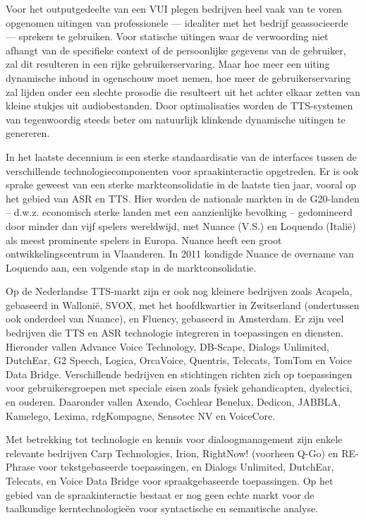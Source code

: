 \begin{multicols}{2}
    Voor het outputgedeelte van een VUI plegen bedrijven heel vaak van te voren opgenomen uitingen van professionele --- idealiter met het bedrijf geassocieerde --- sprekers te gebruiken. Voor statische uitingen waar de verwoording niet afhangt van de specifieke context of de persoonlijke gegevens van de gebruiker, zal dit resulteren in een rijke gebruikerservaring. Maar hoe meer een uiting dynamische inhoud in ogenschouw moet nemen, hoe meer de gebruikerservaring zal lijden onder een slechte prosodie die resulteert uit het achter elkaar zetten van kleine stukjes uit audiobestanden. Door optimalisaties worden de TTS-systemen van tegenwoordig steeds beter om natuurlijk klinkende dynamische uitingen  te genereren.

    In het laatste decennium is een sterke standaardisatie van de interfaces tussen de verschillende technologiecomponenten voor spraakinteractie opgetreden.  Er is ook sprake geweest van een sterke marktconsolidatie in de laatste tien jaar, vooral op het gebied van ASR en TTS. Hier worden de nationale markten in de G20-landen -- d.w.z. economisch sterke landen met een aanzienlijke bevolking -- gedomineerd door minder dan vijf spelers wereldwijd, met Nuance (V.S.) en Loquendo (Itali{\"e}) als meest prominente spelers in Europa. Nuance heeft een groot ontwikkelingscentrum in Vlaanderen. In 2011 kondigde Nuance de overname van Loquendo aan, een volgende stap in de marktconsolidatie.

    Op de Nederlandse TTS-markt zijn er ook nog kleinere bedrijven zoals Acapela, gebaseerd in Walloni{\"e}, SVOX, met het hoofdkwartier in Zwitserland (ondertussen ook onderdeel van Nuance), en Fluency, gebaseerd in Amsterdam. Er zijn veel bedrijven die TTS en ASR technologie integreren in toepassingen en diensten. Hieronder vallen Advance Voice Technology, DB-Scape, Dialogs Unlimited, DutchEar,   G2 Speech,  Logica, OrcaVoice, Quentris, Telecats, TomTom en Voice Data Bridge. Verschillende bedrijven en stichtingen richten zich op toepassingen voor gebruikersgroepen met speciale eisen zoals fysiek gehandicapten, dyslectici, en ouderen. Daaronder vallen Axendo, Cochlear Benelux, Dedicon, JABBLA, Kamelego, Lexima, rdgKompagne, Sensotec NV en VoiceCore.

    Met betrekking tot technologie en kennis voor dialoogmanagement zijn enkele relevante bedrijven Carp Technologies, Irion, RightNow! (voorheen Q-Go) en  RE-Phrase voor tekstgebaseerde toepassingen, en  Dialogs Unlimited, DutchEar, Telecats, en Voice Data Bridge  voor spraakgebaseerde toepassingen. Op het gebied van de spraakinteractie bestaat er nog geen echte markt voor de taalkundige kerntechnologie{\"e}n voor syntactische en semantische analyse.


\end{multicols}

